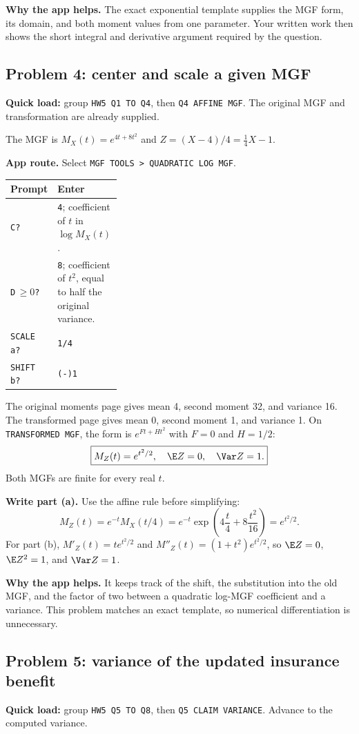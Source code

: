 \textbf{Why the app helps.} The exact exponential template supplies the MGF form, its domain, and both moment values from one parameter. Your written work then shows the short integral and derivative argument required by the question.

\subsection{Problem 4: center and scale a given MGF}
\textbf{Quick load:} group \texttt{HW5 Q1 TO Q4}, then \texttt{Q4 AFFINE MGF}. The original MGF and transformation are already supplied.

The MGF is $M_X(t)=e^{4t+8t^2}$ and $Z=(X-4)/4=\frac14X-1$.

\textbf{App route.} Select \texttt{MGF TOOLS > QUADRATIC LOG MGF}.
\begin{center}
\begin{tabularx}{\linewidth}{@{}p{0.32\linewidth}X@{}}
\toprule Prompt & Enter\\\midrule
\texttt{C?} & \texttt{4}; coefficient of $t$ in $\log M_X(t)$.\\
\texttt{D}\,$\ge0$\texttt{?} & \texttt{8}; coefficient of $t^2$, equal to half the original variance.\\
\texttt{SCALE a?} & \texttt{1/4}\\
\texttt{SHIFT b?} & \texttt{(-)1}\\\bottomrule
\end{tabularx}
\end{center}
The original moments page gives mean 4, second moment 32, and variance 16. The transformed page gives mean 0, second moment 1, and variance 1. On \texttt{TRANSFORMED MGF}, the form is $e^{Ft+Ht^2}$ with $F=0$ and $H=1/2$:
\[
\boxed{M_Z(t)=e^{t^2/2},\quad \E Z=0,\quad \Var Z=1.}
\]
Both MGFs are finite for every real $t$.

\textbf{Write part (a).} Use the affine rule before simplifying:
\[
M_Z(t)=e^{-t}M_X(t/4)
=e^{-t}\exp\!\left(4\frac t4+8\frac{t^2}{16}\right)=e^{t^2/2}.
\]
For part (b), $M'_Z(t)=te^{t^2/2}$ and $M''_Z(t)=(1+t^2)e^{t^2/2}$, so $\E Z=0$, $\E Z^2=1$, and $\Var Z=1$.

\textbf{Why the app helps.} It keeps track of the shift, the substitution into the old MGF, and the factor of two between a quadratic log-MGF coefficient and a variance. This problem matches an exact template, so numerical differentiation is unnecessary.

\subsection{Problem 5: variance of the updated insurance benefit}
\textbf{Quick load:} group \texttt{HW5 Q5 TO Q8}, then \texttt{Q5 CLAIM VARIANCE}. Advance to the computed variance.

